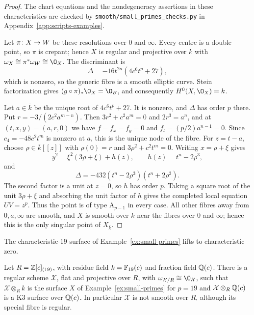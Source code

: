 \begin{proof}
The chart equations and the nondegeneracy assertions in these characteristics are checked by \texttt{smooth/small\_primes\_checks.py} in Appendix~\ref{app:scripts-examples}.

Let $\pi\colon X\to W$ be these resolutions over $0$ and $\infty$.
Every centre is a double point, so $\pi$ is crepant; hence $X$ is regular and projective over $k$ with $\omega_X\cong\pi^*\omega_W\cong\O_X$.
The discriminant is
\[
  \Delta = -16t^{2n}(4c^6t^p+27),
\]
which is nonzero, so the generic fibre is a smooth elliptic curve.
Stein factorization gives $(g\circ\pi)_*\O_X = \O_B$, and consequently $H^0(X,\O_X) = k$.

Let $a\in\overline k$ be the unique root of $4c^6t^p+27$.
It is nonzero, and $\Delta$ has order $p$ there.
Put $r = -3/(2c^2a^{m-n})$.
Then $3r^2+c^2a^m = 0$ and $2r^3 = a^n$, and at $(t,x,y) = (a,r,0)$ we have $f = f_x = f_y = 0$ and $f_t = (p/2)a^{n-1} = 0$.
Since $c_4 = -48c^2t^m$ is nonzero at $a$, this is the unique node of the fibre.
For $z = t-a$, choose $\rho\in\overline k[[z]]$ with $\rho(0) = r$ and $3\rho^2+c^2t^m = 0$.
Writing $x = \rho+\xi$ gives
\[
  y^2 = \xi^2(3\rho+\xi)+h(z),\qquad h(z) = t^n-2\rho^3,
\]
and
\[
  \Delta = -432(t^n-2\rho^3)(t^n+2\rho^3).
\]
The second factor is a unit at $z = 0$, so $h$ has order $p$.
Taking a square root of the unit $3\rho+\xi$ and absorbing the unit factor of $h$ gives the completed local equation $UV = z^p$.
Thus the point is of type $\mathrm A_{p-1}$ in every case.
All other fibres away from $0,a,\infty$ are smooth, and $X$ is smooth over $k$ near the fibres over $0$ and $\infty$; hence this is the only singular point of $X_{\bar k}$.
\end{proof}

The characteristic-$19$ surface of Example~\ref{ex:small-primes} lifts to characteristic zero.

\begin{proposition}\label{prop:small-primes-lift}\label{prop:p19-lift}
Let $R = \mathbb{Z}[c]_{(19)}$, with residue field $k = \mathbb{F}_{19}(c)$ and fraction field $\mathbb{Q}(c)$.
There is a regular scheme $\mathcal X$, flat and projective over $R$, with $\omega_{\mathcal X/R}\cong\O_{\mathcal X}$, such that $\mathcal X\otimes_Rk$ is the surface $X$ of Example~\ref{ex:small-primes} for $p = 19$ and $\mathcal X\otimes_R\mathbb{Q}(c)$ is a K3 surface over $\mathbb{Q}(c)$.
In particular $\mathcal X$ is not smooth over $R$, although its special fibre is regular.
\end{proposition}

